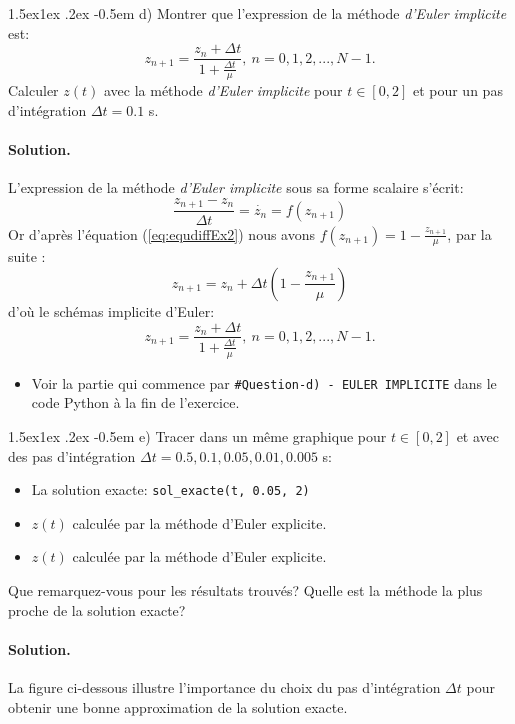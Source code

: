 \documentclass[%
oneside,                 %
final,                   %
10pt,french]{article}
\makeatletter
\newenvironment{doconceexercise}{}{}
\newcommand\subex{\@startsection{paragraph}{4}{\z@}%
                  {1.5ex\@plus1ex \@minus.2ex}%
                  {-0.5em}%
                  {\normalfont\normalsize\bfseries}}
\makeatother
\begin{document}
\begin{doconceexercise}
\noindent

\subex{d)}
Montrer que l'expression de la méthode \emph{d'Euler implicite} est: $$z_{n+1} = \frac{z_n + \Delta t}{1 + \frac{\Delta t}{\mu}}, \ n = 0, 1, 2, ..., N-1.$$
Calculer $z(t)$ avec la méthode \emph{d'Euler implicite} pour $t \in [0, 2]$ et pour un pas d’intégration $\Delta t = 0.1$ s.


\paragraph{Solution.}
L'expression de la méthode \emph{d'Euler implicite} sous sa forme scalaire s'écrit:
$$\frac{z_{n+1} - z_n}{\Delta t} = \dot{z_n} = f(z_{n+1})$$
Or d'après l'équation (\ref{eq:equdiffEx2}) nous avons $f(z_{n+1}) = 1 - \frac{z_{n+1}}{\mu}$, par la suite :
$$z_{n+1} = z_n + \Delta t (1 - \frac{z_{n+1}}{\mu})$$
d'où le schémas implicite d'Euler:
$$z_{n+1} = \frac{z_n + \Delta t}{1 + \frac{\Delta t}{\mu}}, \ n = 0, 1, 2, ..., N-1.$$
\begin{itemize}
\item Voir la partie qui commence par \Verb!#Question-d) - EULER IMPLICITE! dans le code Python à la fin de l'exercice.
\end{itemize}

\noindent

\subex{e)}
Tracer dans un même graphique pour $t \in [0, 2]$ et avec des pas d'intégration
 $\Delta t = 0.5, 0.1, 0.05, 0.01, 0.005$ s:
\begin{itemize}
 \item La solution exacte: \Verb!sol_exacte(t, 0.05, 2)!

 \item $z(t)$ calculée par la méthode d'Euler explicite.

 \item $z(t)$ calculée par la méthode d'Euler explicite.
\end{itemize}

\noindent
Que remarquez-vous pour les résultats trouvés? Quelle est la méthode la plus proche de la solution exacte?


\paragraph{Solution.}
La figure ci-dessous illustre l'importance du choix du pas d'intégration $\Delta t$ pour obtenir une bonne approximation de la solution exacte.




\end{doconceexercise}
\end{document}
